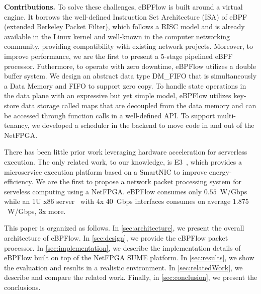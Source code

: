 
\textbf{Contributions.} To solve these challenges, eBPFlow is built around a virtual engine.
It borrows the well-defined Instruction Set Architecture (ISA) of eBPF (extended Berkeley Packet Filter), which follows a RISC model and is already available in the Linux kernel and well-known in the computer networking community, providing compatibility with existing network projects.
Moreover, to improve performance, we are the first to present a 5-stage pipelined eBPF processor.
Futhermore, to operate with zero downtime, eBPFlow utilizes a double buffer system.
We design an abstract data type DM\_FIFO that is simultaneously a Data Memory and FIFO to support zero copy. 
To handle state operations in the data plane with an expressive but yet simple model, eBPFlow utilizes key-store data storage called maps that are decoupled from the data memory and can be accessed through function calls in a well-defined API.
To support multi-tenancy, we developed a scheduler in the backend to move code in and out of the NetFPGA.


There has been little prior work leveraging hardware acceleration for serverless execution.
The only related work, to our knowledge, is E3~\cite{liu2019e3}, which provides a microservice execution platform based on a SmartNIC to improve energy-efficiency. We are the first to propose a network packet processing system for serveless computing using a NetFPGA. eBPFlow consumes only $0.55$~W/Gbps while an 1U x86 server~\cite{x86serverIBM} with 4x 40~Gbps interfaces consumes on average $1.875$~W/Gbps, 3x more. 




This paper is organized as follows. In \textsection\ref{sec:architecture}, we present the overall architecture of eBPFlow. In \textsection\ref{sec:design}, we provide the eBPFlow packet processor. In \textsection\ref{sec:implementation}, we describe the implementation details of eBPFlow built on top of the NetFPGA SUME platform. In \textsection\ref{sec:results}, we show the evaluation and results in a realistic environment. 
In \textsection\ref{sec:relatedWork}, we describe and compare the related work. Finally, in \textsection\ref{sec:conclusion}, we present the conclusions.


